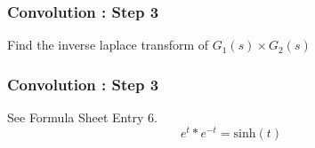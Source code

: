 \documentclass{beamer}
\begin{document}
\begin{frame}
\frametitle{Convolution : Step 3}
Find the inverse laplace transform of $G_1(s) \times G_2(s)$




\end{frame}


\begin{frame}
\frametitle{Convolution : Step 3}
\Large

See Formula Sheet Entry 6.
\[e^t \ast e^{-t} = \mbox{sinh}(t) \]



\end{frame}


\end{document}
